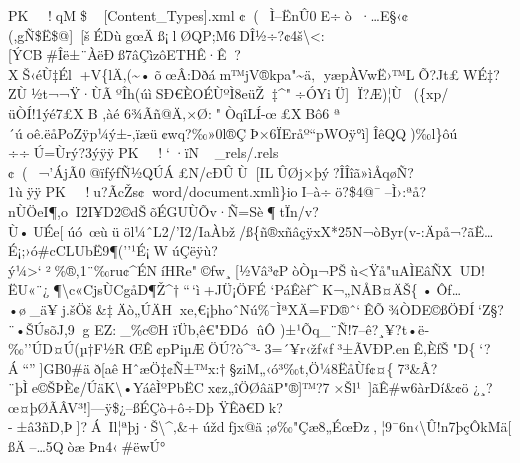 PK     ! qM\textquotesingle­  \$    {[}Content\_Types{]}.xml
¢(~                                                                                                                                                                                                                                                                                                                                                                                                                                                                                                                                 Ì--ËnÛ0E÷ò·\ldots E§‹¢(,gÑ\$Ë\$@{]}~{[}šÉDùgœÄß¡lØQP;M6DÎ½÷?¢4š\textbackslash\textless:{[}ÝCB\textbar\#Îë±¨ÀëÐß7âÇìzôETHÊ·Ê?XŠ‹éÙ‡Él+V\{lÄ‚(\textasciitilde•õœÂ:Dðám™jV®kpa"\textasciitilde ä‚
yæpÀVwË›™LÕ?Jt£WÉ‡?ZÙ½t¬¬Ÿ·ÙÃºÎh(úìSÐ€ÈOÉÙºÌ8eüŽ‡\^{}"÷ÓYiÜ{]}
Ï?Æ)¦Ù(\{xp/üÒÍ!1ýé7£XB ­,àé 6¾Ãñ@Ä‚× Ø:"ÒqîLÍ-œ£XBô6
ª´úoê.ëåPo\textbar Zÿp¼ý±-,ïæü¢wq?‰»0l®ÇÞ×6ÏEråº``pWOÿ°ì{]}ÎêQ\textbar Q)‰l\}ôú
÷÷Ú=Ùrý?3ý  ÿÿ PK     ! `·ï   N   \_rels/.rels
¢(~                                                                                                                                                                                                                                                                                                                                                                                                                                                                                                                                 ¬'ÁjÃ0@ïƒýƒÑ½QÚÁ£N/cÐÛÙ{[}ILÛØj×þý?ÎÎîã»ìÅq\textquotesingle øÑ?1ù  ÿÿ PK     ! u?ÃcŽ  s¢    word/document.xmlì\}ioI--à÷ö?\$4@¯--Ì›:ªå?nÙÖeI¶,oI2I¥D2©dŠõÉGUÙÕv·Ñ=Sè¶tÏn/v?Ù•UÉe{[}úó~œùüö\textquotesingle l¼ˆL2/'I2/IaÀbž/ß\{ñ®xñâçÿxX*25N¬òByr(v-:Äpå¬?ãË\ldots É¡;›ó\#cCLUbË9¶(''¹É¡WúÇëÿù?ý¼\textgreater`²\%®,1¨‰ru¢\^{}ÉNíHRe"©fw¸{[}½Vâ³¢PòÒµ¬PŠù\textless Ÿå"uAÌEâÑXUD!ËU«¨¿¶\textbackslash c«CjsÙCg­åD¶Ž\^{}†``\,`ì+JÜ¡ÖFÉ
`PáÊèf\^{}K¬„NÅB¤ÄŠ\{•Ôf\ldots•ø\_ä¥j.šÖš\&‡Äò„ÚÄHxe‚€¡þhoˆNú\%¯ÌªXÄ=FD®ˆ`ÊÕ¾ÒDE©ßÖÐÍ­`Z§?¨•ŠÚsõJ,9g
EZ:\_\%c©H ïÜb,ê€"ÐDó\textquotesingle{} ûÔ
)±\textbar¹Õq\_¨Ñ!7--ê­?¸¥?t•ë­‰''ÚD¤Ú(µ†F½RŒÊ¢pPiµÆÖÚ?ò\^{}³-3=´¥r‹žƒ«ƒ³±ÃVÐP.e\textquotesingle nÊ‚ÈfŠ"D\{`?Á``''{]}GB0\#äð{[}aêHˆæÖ\textquotesingle‡¢Ñ±™x:†§ziM„‹ó³‰t,Ö¼8ËåÙƒ¢¤\{7³\&Â?¨þÌe©ŠÞÈ¢/ÚäK\textbackslash•YáêÌºPbËCx¢z„îÖØâäP"®{]}™?7×Šl¹~{]}ãÊ\#w6àrDí\&¢ö
¿¸?œ¤þØÃÂV³!{]}---ÿ\$¿--ßÉÇò+ô÷Dþ
ŸÊ\textquotesingle ð€Dk?-±â3ñD,Þ{]}?Á~Il¦ªþj·Š\textbackslash\^{}‚\&+úždƒjx@ä;ø‰"Çæ8„ÉœÐz‚¦9 ¯6n‹\textbackslash Û!n7þçÔkMä{[}ßÄ--\ldots5QòæÞn4‹\#ëwÚ°

